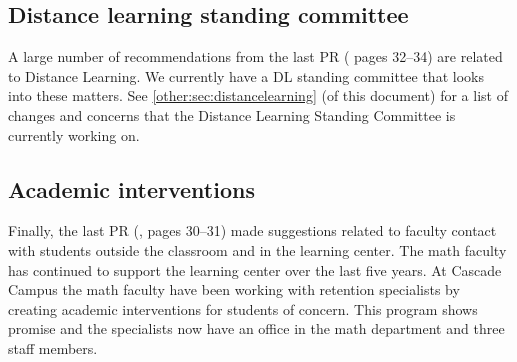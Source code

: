 \subsection{Distance learning standing committee}
A large number of recommendations from the last PR (\cite{mathprogramreview2003} pages 32--34) are related to
Distance Learning. We currently have a DL standing committee that looks into
these matters.  See \vref{other:sec:distancelearning} (of this document) for a list of changes and concerns
that the Distance Learning Standing Committee is currently working on.

\subsection{Academic interventions}
Finally, the last PR (\cite{mathprogramreview2003}, pages 30--31) made suggestions related to faculty contact with
students outside the classroom and in the learning center.  The math faculty has
continued to support the learning center over the last five years.  At Cascade
Campus the math faculty have been working with retention specialists by creating
academic interventions for students of concern.  This program shows promise and
the specialists now have an office in the math department and three staff members.
